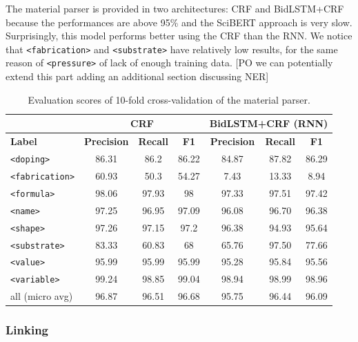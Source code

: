 \documentclass{article}
\begin{document}
The material parser is provided in two architectures: CRF and BidLSTM+CRF because the performances are above 95\% and the SciBERT approach is very slow. 
Surprisingly, this model performs better using the CRF than the RNN. We notice that \texttt{<fabrication>} and \texttt{<substrate>} have relatively low results, for the same reason of \texttt{<pressure>} of lack of enough training data.
[PO we can potentially extend this part adding an additional section discussing NER]

\begin{table}[ht]
\centering
\begin{tabular}{l|ccc|ccc}
& \multicolumn{3}{c}{\textbf{CRF}} & \multicolumn{3}{c}{\textbf{BidLSTM+CRF} (RNN)}\\ 
\hline \textbf{Label} & \textbf{Precision} & \textbf{Recall} & \textbf{F1} & \textbf{Precision} & \textbf{Recall} & \textbf{F1} \\ \hline

\texttt{<doping>}      & 86.31   & 86.2     & 86.22 & 84.87 &  87.82 & 86.29   \\
\texttt{<fabrication>} & 60.93   & 50.3     & 54.27 & 7.43  &  13.33 & 8.94   \\
\texttt{<formula>}     & 98.06   & 97.93    & 98    & 97.33 &  97.51 & 97.42  \\
\texttt{<name>}        & 97.25   & 96.95    & 97.09 & 96.08 &  96.70 & 96.38  \\
\texttt{<shape>}       & 97.26   & 97.15    & 97.2  & 96.38 &  94.93 & 95.64  \\
\texttt{<substrate>}   & 83.33   & 60.83    & 68    & 65.76 &  97.50 & 77.66  \\
\texttt{<value>}       & 95.99   & 95.99    & 95.99 & 95.28 &  95.84 & 95.56  \\
\texttt{<variable>}    & 99.24   & 98.85    & 99.04 & 98.94 &  98.99 & 98.96  \\
\hline
all  (micro avg)       & 96.87   & 96.51    & 96.68  & 95.75 &   96.44  &  96.09  \\
\hline
\end{tabular}
\caption{Evaluation scores of 10-fold cross-validation of the material parser. }
\label{tab:evaluation-10fold-material-parser}
\end{table}


\subsubsection{Linking}
\end{document}
